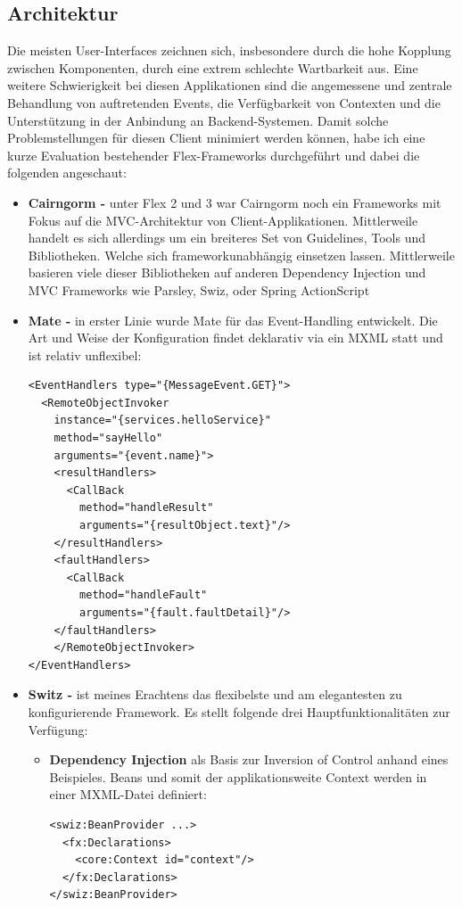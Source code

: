 \subsection{Architektur}
Die meisten User-Interfaces zeichnen sich, insbesondere durch die hohe Kopplung zwischen Komponenten, durch eine extrem schlechte Wartbarkeit aus. Eine weitere Schwierigkeit bei diesen Applikationen sind die angemessene und zentrale Behandlung von auftretenden Events, die Verf\"ugbarkeit von Contexten und die Unterst\"utzung in der Anbindung an Backend-Systemen. Damit solche Problemstellungen f\"ur diesen Client minimiert werden k\"onnen, habe ich eine kurze Evaluation bestehender Flex-Frameworks durchgef\"uhrt und dabei die folgenden angeschaut:
\begin{itemize}
\item \textbf{Cairngorm\cite{Cairngorm} - } unter Flex 2 und 3 war Cairngorm noch ein Frameworks mit Fokus auf die MVC-Architektur von Client-Applikationen. Mittlerweile handelt es sich allerdings um ein breiteres Set von Guidelines, Tools und Bibliotheken. Welche sich frameworkunabh\"angig einsetzen lassen. Mittlerweile basieren viele dieser Bibliotheken auf anderen Dependency Injection und MVC Frameworks wie Parsley, Swiz, oder Spring ActionScript
\item \textbf{Mate\cite{Mate} - } in erster Linie wurde Mate f\"ur das Event-Handling entwickelt. Die Art und Weise der Konfiguration findet deklarativ via ein MXML statt und ist relativ unflexibel:

\begin{lstlisting}[caption=Event-Deklaration mit dem Mate Framework]
<EventHandlers type="{MessageEvent.GET}">
  <RemoteObjectInvoker 
    instance="{services.helloService}" 
    method="sayHello" 
    arguments="{event.name}">
    <resultHandlers>
      <CallBack 
        method="handleResult" 
        arguments="{resultObject.text}"/>
    </resultHandlers>
    <faultHandlers>
      <CallBack 
        method="handleFault" 
        arguments="{fault.faultDetail}"/>
    </faultHandlers>
    </RemoteObjectInvoker>
</EventHandlers>
\end{lstlisting}

\item \textbf{Switz\cite{Swiz} - }ist meines Erachtens das flexibelste und am elegantesten zu konfigurierende Framework. Es stellt folgende drei Hauptfunktionalit\"aten zur Verf\"ugung:
\begin{itemize}
	\item \textbf{Dependency Injection} als Basis zur Inversion of Control anhand eines Beispieles. Beans und somit der applikationsweite Context werden in einer MXML-Datei definiert:
\begin{lstlisting}[caption=Swiz: Bean Deklaration]
<swiz:BeanProvider ...>
  <fx:Declarations>
    <core:Context id="context"/>
  </fx:Declarations>
</swiz:BeanProvider>
\end{lstlisting}


\end{itemize}
\end{itemize}
